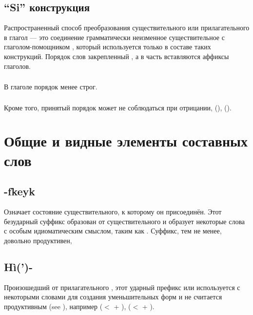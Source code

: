 \subsection{``Si'' конструкция} Распространенный способ преобразования существительного или прилагательного в глагол — это соединение грамматически неизменное существительное с глаголом-помощником
, который используется только в составе таких конструкций. Порядок слов закрепленный , а в часть  вставляются аффиксы глаголов.\label{lingop:si-const}

\subsubsection{} В глаголе   порядок менее строг.

\subsubsection{} Кроме того, принятый порядок  может не соблюдаться при отрицании,   (),
  ().


\section{Общие и видные элементы составных слов}

\subsection{-fkeyk} Означает состояние существительного, к которому он присоединён. Этот безударный суффикс образован от существительного   и образует некоторые слова с особым идиоматическим смыслом, таким как 
. Суффикс, тем не менее, довольно продуктивен,  

\subsection{Hì(')-} Произошедший от прилагательного  , этот ударный префикс  или  используется с некоторыми словами для создания уменьшительных форм и не считается продуктивным (see ),
например   ($<$  + 
),   ($<$  +
 ).  


